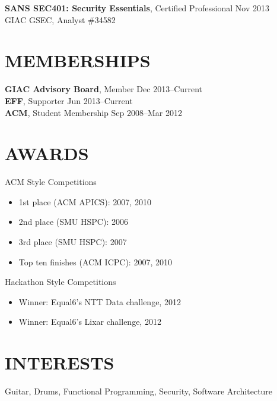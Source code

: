 \documentclass[line,margin]{res}
\begin{document}
\begin{resume}
\textbf{SANS SEC401: Security Essentials}, Certified Professional \hfill Nov 2013 \\
GIAC GSEC, Analyst \#34582

\section{MEMBERSHIPS}
\textbf{GIAC Advisory Board}, Member \hfill Dec 2013--Current \\
\textbf{EFF}, Supporter \hfill Jun 2013--Current \\
\textbf{ACM}, Student Membership \hfill Sep 2008--Mar 2012

\section{AWARDS}
ACM Style Competitions
\begin{itemize} \itemsep-2pt
    \item 1st place (ACM APICS): 2007, 2010
    \item 2nd place (SMU HSPC): 2006
    \item 3rd place (SMU HSPC): 2007
    \item Top ten finishes (ACM ICPC): 2007, 2010
\end{itemize}

Hackathon Style Competitions
\begin{itemize} \itemsep-2pt
    \item Winner: Equal6's NTT Data challenge, 2012
    \item Winner: Equal6's Lixar challenge, 2012
\end{itemize}

\section{INTERESTS}
Guitar, Drums, Functional Programming, Security, Software Architecture

\end{resume}
\end{document}
